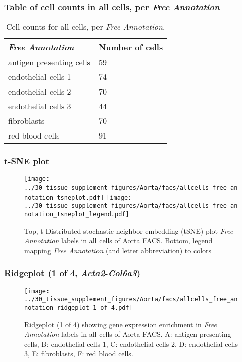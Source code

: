 \subsubsection{Table of cell counts in all cells, per \emph{Free Annotation}}\begin{table}[h]
\centering
\label{my-label}
\begin{tabular}{@{}ll@{}}
\toprule

\emph{Free Annotation}& Number of cells \\ \midrule
antigen presenting cells & 59 \\

endothelial cells 1 & 74 \\

endothelial cells 2 & 70 \\

endothelial cells 3 & 44 \\

fibroblasts & 70 \\

red blood cells & 91 \\
\bottomrule
\end{tabular}
\caption{Cell counts for all cells, per \emph{Free Annotation}.}
\end{table}

\clearpage
\subsubsection{t-SNE plot}
\begin{figure}[h]
\centering
\texttt{[image: ../30\_tissue\_supplement\_figures/Aorta/facs/allcells\_free\_annotation\_tsneplot.pdf]}
\texttt{[image: ../30\_tissue\_supplement\_figures/Aorta/facs/allcells\_free\_annotation\_tsneplot\_legend.pdf]}
\caption{Top, t-Distributed stochastic neighbor embedding (tSNE) plot  \emph{Free Annotation} labels in all cells of Aorta FACS. Bottom, legend mapping \emph{Free Annotation} (and letter abbreviation) to colors}
\end{figure}


\clearpage

\subsubsection{Ridgeplot (1 of 4, \emph{Acta2}-\emph{Col6a3})}
\begin{figure}[h]
\centering
\texttt{[image: ../30\_tissue\_supplement\_figures/Aorta/facs/allcells\_free\_annotation\_ridgeplot\_1-of-4.pdf]}

\caption{ Ridgeplot (1 of 4)  showing gene expression enrichment in \emph{Free Annotation} labels in all cells of Aorta FACS. A: antigen presenting cells, B: endothelial cells 1, C: endothelial cells 2, D: endothelial cells 3, E: fibroblasts, F: red blood cells.}
\end{figure}


